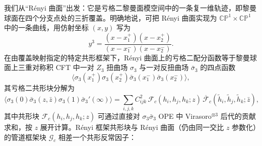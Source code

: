 我们从“Rényi 曲面”出发：它是亏格二黎曼面模空间中的一条复一维轨迹，即黎曼球面在四个分支点处的三折覆盖。明确地说，可把 Rényi 曲面实现为 $\mathbb{CP}^1\times\mathbb{CP}^1$ 中的一条曲线，用仿射坐标 $(x,y)$ 写为
\begin{equation}
  \label{eq:5-42}
  y^3 = \frac{(x-x_1^+)(x-x_2^+)}
             {(x-x_1^-)(x-x_2^-)}.
\end{equation}
在由覆盖映射指定的特定共形框架下，Rényi 曲面上的亏格二配分函数等于黎曼球面上三重对称积 CFT 中一对 $Z_3$ 扭曲场 $\sigma_3$ 与一对反扭曲场 $\bar\sigma_3$ 的四点函数
\begin{equation}
  \label{eq:5-43}
  \bigl\langle \sigma_3(x_1^+)\sigma_3(x_2^+)
    \bar\sigma_3(x_1^-)\bar\sigma_3(x_2^-)\bigr\rangle,
\end{equation}
其亏格二共形块分解为
\begin{equation}
  \label{eq:5-44}
  \bigl\langle \sigma_3(0)\bar\sigma_3(z,\bar z)
    \sigma_3(1)\bar\sigma_3'(\infty)\bigr\rangle
  = \sum_{i,j,k} C_{ijk}^2\,
    \mathcal{F}_c(h_i,h_j,h_k;z)\,
    \overline{\mathcal{F}}_c
      (\tilde h_i,\tilde h_j,\tilde h_k;\bar z),
\end{equation}
其中共形块 $\mathcal{F}_c(h_i,h_j,h_k;z)$ 可通过直接对 $\sigma_3\bar\sigma_3$ OPE 中 Virasoro$^{\otimes 3}$ 后代的贡献求和，按 $z$ 展开计算。Rényi 框架共形块与 Rényi 曲面（仍由同一交比 $z$ 参数化）的管道框架块 $\mathcal{G}_c$ 相差一个共形反常因子：



